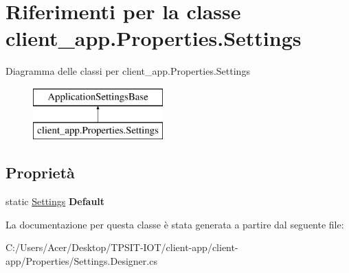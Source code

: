 \hypertarget{classclient__app_1_1_properties_1_1_settings}{}\section{Riferimenti per la classe client\+\_\+app.\+Properties.\+Settings}
\label{classclient__app_1_1_properties_1_1_settings}
Diagramma delle classi per client\+\_\+app.\+Properties.\+Settings\begin{figure}[H]
\begin{center}
\leavevmode
\includegraphics[height=2.000000cm]{classclient__app_1_1_properties_1_1_settings}
\end{center}
\end{figure}
\subsection*{Proprietà}
\begin{DoxyCompactItemize}
\item 
\mbox{\label{classclient__app_1_1_properties_1_1_settings_a241314f809fbecd11d92dff698df091b}} 
static \mbox{\hyperlink{classclient__app_1_1_properties_1_1_settings}{Settings}} {\bfseries Default}
\end{DoxyCompactItemize}


La documentazione per questa classe è stata generata a partire dal seguente file\+:\begin{DoxyCompactItemize}
\item 
C\+:/\+Users/\+Acer/\+Desktop/\+T\+P\+S\+I\+T-\/\+I\+O\+T/client-\/app/client-\/app/\+Properties/Settings.\+Designer.\+cs\end{DoxyCompactItemize}

